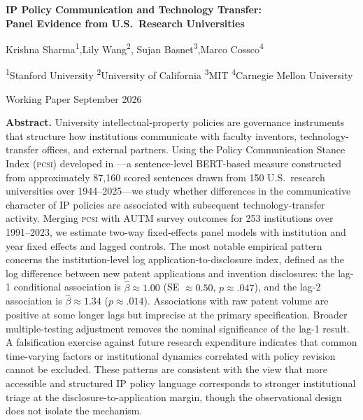 \documentclass[12pt]{article}
\newcommand{\PCSI}{\textsc{pcsi}}
\begin{document}
\begin{titlepage}
\begin{center}
\vspace*{1.5cm}

{\LARGE \textbf{IP Policy Communication and Technology Transfer:}}\\[0.4em]
{\LARGE \textbf{Panel Evidence from U.S.\ Research Universities}}

\vspace{1.2cm}

{\large Krishna Sharma\textsuperscript{1},\quad Lily Wang\textsuperscript{2},\quad
Sujan Basnet\textsuperscript{3},\quad Marco Cossco\textsuperscript{4}}

\vspace{0.6cm}
{\normalsize
\textsuperscript{1}Stanford University\quad
\textsuperscript{2}University of California\quad
\textsuperscript{3}MIT\quad
\textsuperscript{4}Carnegie Mellon University}

\vspace{1.2cm}
{\normalsize Working Paper \hspace{2em} September 2026}

\vspace{1.4cm}

\begin{minipage}{0.85\textwidth}
\small
\textbf{Abstract.} University intellectual-property policies are governance instruments
that structure how institutions communicate with faculty inventors, technology-transfer
offices, and external partners. Using the Policy Communication Stance Index (\PCSI{})
developed in \citet{sharma2026pcsi}---a sentence-level BERT-based measure constructed
from approximately 87,160 scored sentences drawn from 150 U.S.\ research universities
over 1944--2025---we study whether differences in the communicative character of IP
policies are associated with subsequent technology-transfer activity. Merging \PCSI{}
with AUTM survey outcomes for 253 institutions over 1991--2023, we estimate two-way
fixed-effects panel models with institution and year fixed effects and lagged controls.
The most notable empirical pattern concerns the institution-level log
application-to-disclosure index, defined as the log difference between new patent
applications and invention disclosures: the lag-1 conditional association is
$\hat\beta \approx 1.00$ (SE $\approx 0.50$, $p \approx .047$), and the lag-2
association is $\hat\beta \approx 1.34$ ($p \approx .014$). Associations with raw
patent volume are positive at some longer lags but imprecise at the primary specification.
Broader multiple-testing adjustment removes the nominal significance of the lag-1
result. A falsification exercise against future research expenditure indicates that
common time-varying factors or institutional dynamics correlated with policy revision
cannot be excluded. These patterns are consistent with the view that more accessible
and structured IP policy language corresponds to stronger institutional triage at the
disclosure-to-application margin, though the observational design does not isolate the
mechanism.
\end{minipage}


\end{center}
\end{titlepage}
\end{document}
